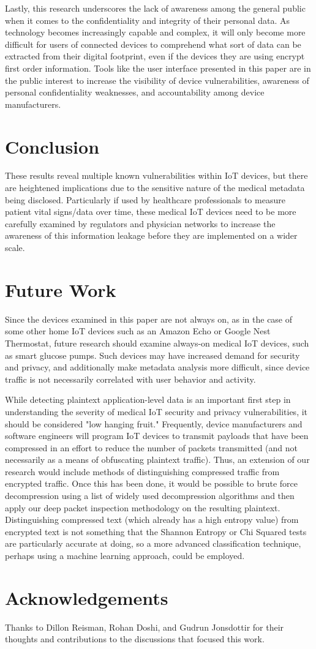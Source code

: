 Lastly, this research underscores the lack of awareness among the general public when it comes to the confidentiality and integrity of their personal data. As technology becomes increasingly capable and complex, it will only become more difficult for users of connected devices to comprehend what sort of data can be extracted from their digital footprint, even if the devices they are using encrypt first order information. Tools like the user interface presented in this paper are in the public interest to increase the visibility of device vulnerabilities, awareness of personal confidentiality weaknesses, and accountability among device manufacturers.


\section{Conclusion}

These results reveal multiple known vulnerabilities within IoT devices, but there are heightened implications due to the sensitive nature of the medical metadata being disclosed. Particularly if used by healthcare professionals to measure patient vital signs/data over time, these medical IoT devices need to be more carefully examined by regulators and physician networks to increase the awareness of this information leakage before they are implemented on a wider scale. 


\section{Future Work}

Since the devices examined in this paper are not always on, as in the case of some other home IoT devices such as an Amazon Echo or Google Nest Thermostat, future research should examine always-on medical IoT devices, such as smart glucose pumps. Such devices may have increased demand for security and privacy, and additionally make metadata analysis more difficult, since device traffic is not necessarily correlated with user behavior and activity. 

While detecting plaintext application-level data is an important first step in understanding the severity of medical IoT security and privacy vulnerabilities, it should be considered "low hanging fruit." Frequently, device manufacturers and software engineers will program IoT devices to transmit payloads that have been compressed in an effort to reduce the number of packets transmitted (and not necessarily as a means of obfuscating plaintext traffic). Thus, an extension of our research would include methods of distinguishing compressed traffic from encrypted traffic. Once this has been done, it would be possible to brute force decompression using a list of widely used decompression algorithms and then apply our deep packet inspection methodology on the resulting plaintext. Distinguishing compressed text (which already has a high entropy value) from encrypted text is not something that the Shannon Entropy or Chi Squared tests are particularly accurate at doing, so a more advanced classification technique, perhaps using a machine learning approach, could be employed. 

\appendix

\section*{Acknowledgements}
Thanks to Dillon Reisman, Rohan Doshi, and Gudrun Jonsdottir for their thoughts and contributions to the discussions that focused this work. 
